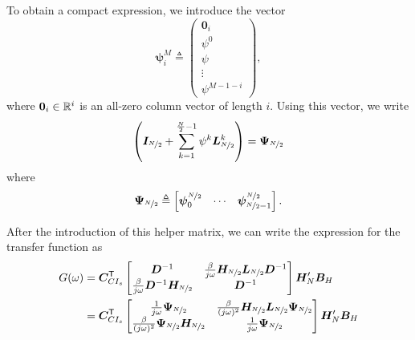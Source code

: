 To obtain a compact expression, we introduce the vector
\begin{equation}
    \label{eq:def_psi_vec}
    \bm{\psi}^M_i \triangleq
    \begin{pmatrix}
        \bm{0}_i \\
        \psi^0 \\
        \psi \\
        \vdots \\
        \psi^{M-1-i}
    \end{pmatrix},
\end{equation}
where $\bm{0}_i \in \mathbb{R}^{i}$ is an all-zero column vector of length $i$. Using this vector, we write
\begin{equation}
    \left( \bm{I}_{\nicefrac{N}{2}} + \sum_{k=1}^{\frac{N}{2}-1}\psi^k \bm{L}_{\nicefrac{N}{2}}^k \right) =\bm{\Psi}_{\nicefrac{N}{2}}
\end{equation}
where
\begin{equation}
    \bm{\Psi}_{\nicefrac{N}{2}} \triangleq
    \begin{bmatrix}
        \bm{\psi}^{\nicefrac{N}{2}}_0 & \cdots & \bm{\psi}^{\nicefrac{N}{2}}_{\nicefrac{N}{2}-1}
    \end{bmatrix}.
\end{equation}

After the introduction of this helper matrix, we can write the expression for the transfer function as
\begin{align}
    G(\omega) & = \CmatT_{CI_s}
    \begin{bmatrix}
        \bm{D}^{-1} & \frac{\beta}{j\omega}\Hn{\nicefrac{N}{2}}\bm{L}_{\nicefrac{N}{2}}\bm{D}^{-1}  \\
        \frac{\beta}{j\omega}\bm{D}^{-1}\Hn{\nicefrac{N}{2}} & \bm{D}^{-1}
    \end{bmatrix}
    \Hn{N}' \Bmat_H \\
    & = \CmatT_{CI_s}
    \begin{bmatrix}
        \frac{1}{j\omega}\bm{\Psi}_{\nicefrac{N}{2}} & \frac{\beta}{(j\omega)^2}\Hn{\nicefrac{N}{2}}\bm{L}_{\nicefrac{N}{2}}\bm{\Psi}_{\nicefrac{N}{2}}  \\
        \frac{\beta}{(j\omega)^2}\bm{\Psi}_{\nicefrac{N}{2}}\Hn{\nicefrac{N}{2}} & \frac{1}{j\omega}\bm{\Psi}_{\nicefrac{N}{2}}
    \end{bmatrix}
    \Hn{N}' \Bmat_H
\end{align}

